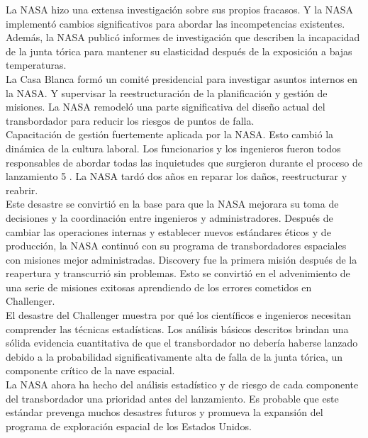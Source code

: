 La NASA hizo una extensa investigación sobre sus propios fracasos. Y la NASA
implementó cambios significativos para abordar las incompetencias existentes.
Además, la NASA publicó informes de investigación que describen la incapacidad
de la junta tórica para mantener su elasticidad después de la exposición a bajas
temperaturas.\\

La Casa Blanca formó un comité presidencial para investigar asuntos internos en
la NASA. Y supervisar la reestructuración de la planificación y gestión de
misiones. La NASA remodeló una parte significativa del diseño actual del
transbordador para reducir los riesgos de puntos de falla.\\

Capacitación de gestión fuertemente aplicada por la NASA. Esto cambió la
dinámica de la cultura laboral. Los funcionarios y los ingenieros fueron todos
responsables de abordar todas las inquietudes que surgieron durante el proceso
de lanzamiento 5 . La NASA tardó dos años en reparar los daños, reestructurar y
reabrir.\\
Este desastre se convirtió en la base para que la NASA mejorara su toma de
decisiones y la coordinación entre ingenieros y administradores. Después de
cambiar las operaciones internas y establecer nuevos estándares éticos y de
producción, la NASA continuó con su programa de transbordadores espaciales con
misiones mejor administradas. Discovery fue la primera misión después de la
reapertura y transcurrió sin problemas. Esto se convirtió en el advenimiento de
una serie de misiones exitosas aprendiendo de los errores cometidos en
Challenger.\\

El desastre del Challenger muestra por qué los científicos e ingenieros
necesitan comprender las técnicas estadísticas. Los análisis básicos descritos
brindan una sólida evidencia cuantitativa de que el transbordador no debería
haberse lanzado debido a la probabilidad significativamente alta de falla de la
junta tórica, un componente crítico de la nave espacial.\\

La NASA ahora ha hecho del análisis estadístico y de riesgo de cada componente
del transbordador una prioridad antes del lanzamiento. Es probable que este
estándar prevenga muchos desastres futuros y promueva la expansión del programa
de exploración espacial de los Estados Unidos.\\

